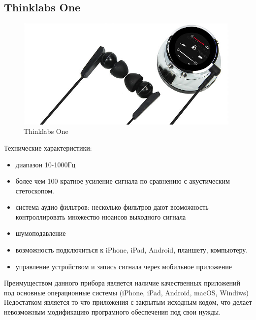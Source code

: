 \documentclass[../paper.tex]{subfiles}
\begin{document}
\subsection{Thinklabs One}
\begin{figure}[H]
\centering
\includegraphics[width=11cm]{images/thinklabs-one}
\caption{Thinklabs One}
\end{figure}

Технические характеристики:\cite{thinklabs-one}
\begin{itemize}
  \item диапазон 10-1000Гц
  \item более чем 100 кратное усиление сигнала по сравнению с акустическим стетоскопом.
  \item система аудио-фильтров: несколько фильтров дают возможность контроллировать множество нюансов выходного сигнала
  \item шумоподавление
  \item возможность подключиться к iPhone, iPad, Android, планшету, компьютеру.
  \item управление устройством и запись сигнала через мобильное приложение
\end{itemize}

Преимуществом данного прибора является наличие качественных приложений под основные операционные системы (iPhone, iPad, Android, macOS, Windiws) Недостатком является то что приложения с закрытым исходным кодом, что делает невозможным модификацию програмного обеспечения под свои нужды.
\end{document}
